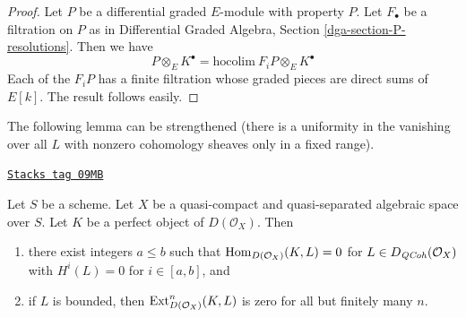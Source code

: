 \begin{proof}
Let $P$ be a differential graded $E$-module with property $P$.
Let $F_\bullet$ be a filtration on $P$ as in
Differential Graded Algebra, Section \ref{dga-section-P-resolutions}.
Then we have
$$
P \otimes_E K^\bullet = \text{hocolim}\ F_iP \otimes_E K^\bullet
$$
Each of the $F_iP$ has a finite filtration whose graded pieces
are direct sums of $E[k]$. The result follows easily.
\end{proof}

The following lemma can be strengthened (there is a uniformity
in the vanishing over all $L$ with nonzero cohomology sheaves
only in a fixed range).

\begin{lemma}
\label{spaces-perfect-lemma-ext-from-perfect-into-bounded-QCoh}
\href{https://stacks.math.columbia.edu/tag/09MB}{\texttt{Stacks tag 09MB}}

Let $S$ be a scheme.
Let $X$ be a quasi-compact and quasi-separated algebraic space over $S$.
Let $K$ be a perfect object of $D(\mathcal{O}_X)$. Then
\begin{enumerate}
\item there exist integers $a \leq b$ such that
$\operatorname{Hom}_{D(\mathcal{O}_X)}(K, L) = 0$ for $L \in D_{\mathit{QCoh}}(\mathcal{O}_X)$
with $H^i(L) = 0$ for $i \in [a, b]$, and
\item if $L$ is bounded, then $\operatorname{Ext}^n_{D(\mathcal{O}_X)}(K, L)$
is zero for all but finitely many $n$.
\end{enumerate}
\end{lemma}

